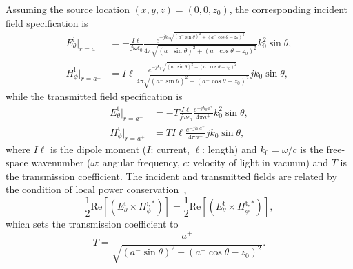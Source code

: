 \documentclass[journal,transaction]{IEEEtran}
\begin{document}
Assuming the source location $(x,y,z)=(0,0,z_0)$, the corresponding incident field specification is
%
\begin{subequations}\label{Eq:case1_in}
\begin{align}
  E_{\theta}^\text{i}|_{r=a^-} & =-\frac{I\ell}{j\omega \epsilon_0}\frac{e^{-jk_0\sqrt{(a^-\sin\theta)^2+(a^-\cos\theta-z_0)^2}}}{4\pi\sqrt{(a^-\sin\theta)^2+(a^-\cos\theta-z_0)^2}}k_0^2\sin\theta,\\
  H_{\phi}^\text{i}|_{r=a^-} & =I\ell\frac{e^{-jk_0\sqrt{(a^-\sin\theta)^2+(a^-\cos\theta-z_0)^2}}}{4\pi\sqrt{(a^-\sin\theta)^2+(a^-\cos\theta-z_0)^2}}jk_0\sin\theta ,
\end{align}
\end{subequations}
%
while the transmitted field specification is
%
\begin{subequations}\label{Eq:case1_out}
\begin{align}
  E_{\theta}^\text{t}|_{r=a^+} & =-T\frac{I\ell}{j\omega \epsilon_0}\frac{e^{-jk_0a^+}}{4\pi a^+}k_0^2\sin\theta,\\
  H_{\phi}^\text{t}|_{r=a^+} & =TI\ell\frac{e^{-jk_0a^+}}{4\pi a^+}jk_0\sin\theta,
\end{align}
\end{subequations}
%
where $I\ell$ is the dipole moment ($I$: current, $\ell$: length) and $k_0=\omega/c$ is the free-space wavenumber ($\omega$: angular frequency, $c$: velocity of light in vacuum) and $T$ is the transmission coefficient. The incident and transmitted fields are related by the condition of local power conservation~\cite{GL_perfect_refraction2017},
%
\begin{equation}\label{Eq:case1_energy_cons}
\frac{1}{2}\text{Re}[(E_{\theta}^\text{i}\times  H_{\phi}^{\text{i},*})]=\frac{1}{2}\text{Re}[(E_{\theta}^\text{t}\times  H_{\phi}^{\text{t},*})],
\end{equation}
%
which sets the transmission coefficient to
%
\begin{equation}\label{Eq:case1_energy_T}
T=\frac{a^+}{\sqrt{(a^-\sin\theta)^2+(a^-\cos\theta-z_0)^2}}.
\end{equation}
\end{document}
